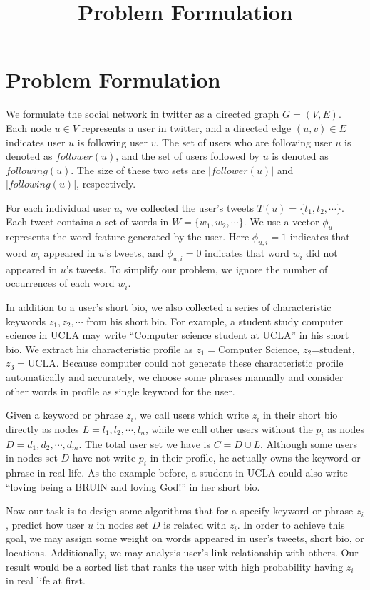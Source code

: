 \documentclass{article}
\begin{document}
\title{Problem Formulation}
\maketitle \else \fi

\newcommand{\following}{\ensuremath{following}}
\newcommand{\follower}{\ensuremath{follower}}

\section{Problem Formulation}\label{sec:problem}
We formulate the social network in twitter as a directed graph $G = (V,E)$.
Each node $u \in V$ represents a user in twitter, and a directed edge $(u,v) \in E$ indicates
user $u$ is following user $v$. The set of users who are following user $u$ is denoted as $\follower(u)$, and the set of users followed by $u$ is denoted as $\following(u)$. The size of these two sets are $|\follower(u)|$ and $|\following(u)|$, respectively.

For each individual user $u$, we collected the user's tweets
$T(u)=\{t_1, t_2, \cdots\}$.
Each tweet contains a set of words in $W=\{w_1, w_2, \cdots\}$.
We use a vector $\phi_u$ represents the word feature generated by the user.
Here $\phi_{u,i}=1$ indicates that word $w_i$ appeared in $u$'s tweets,
and $\phi_{u,i}=0$ indicates that word $w_i$ did not appeared in $u$'s tweets.
To simplify our problem, we ignore the number of occurrences of each word $w_i$.

In addition to a user's short bio,
we also collected a series of characteristic keywords
$z_1, z_2, \cdots$ from his short bio. For example, a student study computer
science in UCLA may write ``Computer science student at UCLA'' in his short bio.
We extract his characteristic profile as
$z_1=$Computer Science, $z_2$=student, $z_3=$UCLA.
Because computer could not generate these characteristic profile automatically
and accurately, we choose some phrases manually and consider other words in
profile as single keyword for the user.

Given a keyword or phrase $z_i$, we call users which write $z_i$ in their
short bio directly as nodes $L={l_1, l_2, \cdots, l_n}$,
while we call other users without the $p_i$ as nodes $D={d_1, d_2, \cdots, d_m}$.
The total user set we have is $C=D \cup L$.
Although some users in nodes set $D$ have not write $p_i$ in their profile,
he actually owns the keyword or phrase in real life.
As the example before, a student in UCLA could also write
``loving being a BRUIN and loving God!'' in her short bio.

Now our task is to design some algorithms that for a specify keyword or
phrase $z_i$, predict how user $u$ in nodes set $D$ is related with $z_i$.
In order to achieve this goal, we may assign some weight on words appeared
in user's tweets, short bio, or locations. Additionally, we may analysis
user's link relationship with others.
Our result would be a sorted list that ranks the user with high probability
having $z_i$ in real life at first.

\ifx \allfiles \undefined
\end{document}
